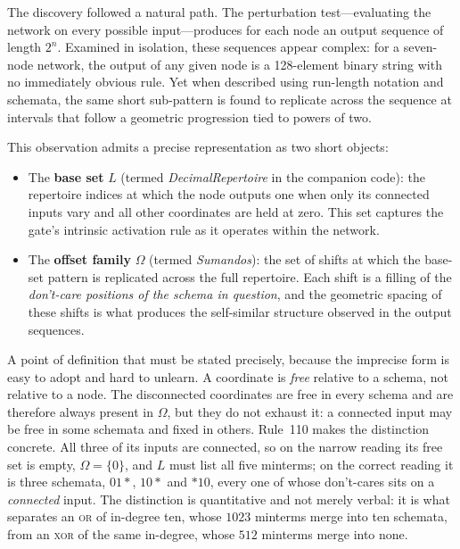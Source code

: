 \documentclass[11pt]{article}
\begin{document}
The discovery followed a natural path.  The perturbation test---evaluating
the network on every possible input---produces for each node an output
sequence of length $2^n$.  Examined in isolation, these sequences appear
complex: for a seven-node network, the output of any given node is a
128-element binary string with no immediately obvious rule.  Yet when
described using run-length notation and schemata, the same short
sub-pattern is found to replicate across the sequence at intervals that
follow a geometric progression tied to powers of two.

This observation admits a precise representation as two short objects:

\begin{itemize}
\item The \textbf{base set} $L$ (termed \emph{DecimalRepertoire} in the
  companion code): the repertoire indices at which the node outputs one
  when only its connected inputs vary and all other coordinates are held
  at zero.  This set captures the gate's intrinsic activation rule as it
  operates within the network.
\item The \textbf{offset family} $\Omega$ (termed \emph{Sumandos}): the
  set of shifts at which the base-set pattern is replicated across the
  full repertoire.  Each shift is a filling of the \emph{don't-care positions of
  the schema in question}, and the geometric spacing of these shifts is what
  produces the self-similar structure observed in the output sequences.
\end{itemize}

A point of definition that must be stated precisely, because the imprecise form
is easy to adopt and hard to unlearn.  A coordinate is \emph{free} relative to a
schema, not relative to a node.  The disconnected coordinates are free in every
schema and are therefore always present in $\Omega$, but they do not exhaust it:
a connected input may be free in some schemata and fixed in others.  Rule~110
makes the distinction concrete.  All three of its inputs are connected, so on the
narrow reading its free set is empty, $\Omega=\{0\}$, and $L$ must list all five
minterms; on the correct reading it is three schemata, $01\ast$, $10\ast$ and
$\ast10$, every one of whose don't-cares sits on a \emph{connected} input.  The
distinction is quantitative and not merely verbal: it is what separates an
\textsc{or} of in-degree ten, whose $1023$ minterms merge into ten schemata, from
an \textsc{xor} of the same in-degree, whose $512$ minterms merge into none.
\end{document}
